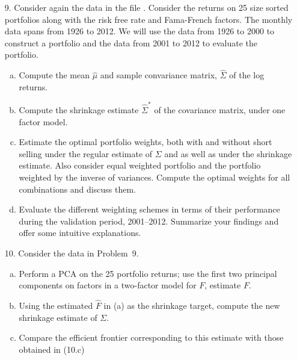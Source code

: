 \begin{enumerate}
\item[9.] Consider again the data in the file . Consider the returns on 25 size sorted portfolios along with the risk free rate and Fama-French factors. The monthly data spans from 1926 to 2012. We will use the data from 1926 to 2000 to construct a portfolio and the data from 2001 to 2012 to evaluate the portfolio. 
	\begin{enumerate}[(a)]
	\item Compute the mean $\hat{\mu}$ and sample convariance matrix, $\hat{\Sigma}$ of the log returns.
	\item Compute the shrinkage estimate $\hat{\Sigma}^*$ of the covariance matrix, under one factor model.
	\item Estimate the optimal portfolio weights, both with and without short selling under the regular estimate of $\Sigma$ and as well as under the shrinkage estimate. Also consider equal weighted portfolio and the portfolio weighted by the inverse of variances. Compute the optimal weights for all combinations and discuss them.
	\item Evaluate the different weighting schemes in terms of their performance during the validation period, 2001--2012. Summarize your findings and offer some intuitive explanations. 
	\end{enumerate}








\item[10.] Consider the data in Problem~9.
	\begin{enumerate}[(a)]
	\item Perform a PCA on the 25 portfolio returns; use the first two principal components on factors in a two-factor model for $F$, estimate $F$.
	\item Using the estimated $\hat{F}$ in (a) as the shrinkage target, compute the new shrinkage estimate of $\Sigma$.
	\item Compare the efficient frontier corresponding to this estimate with those obtained in (10.c)
	\end{enumerate}









\end{enumerate} 